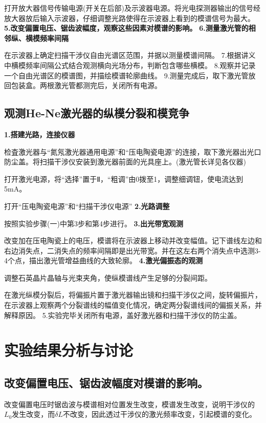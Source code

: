 \documentclass[UTF8]{ctexart}
\begin{document}
\begin{multicols}{2}
打开放大器信号传输电源(开关在后部)及示波器电源。将光电探测器输出的信号经放大器放后输入示波器，仔细调整光路使得在示波器上看到的模谱信号为最大。
\newline\textbf{5.改变偏置电压、锯齿波幅度，观察这些因素对模谱的影响。}
\newline\textbf{6.测量激光管的相邻纵、横模频率间隔}

在示波器上确定扫描干涉仪自由光谱区范围，并据以测量模谱间隔。
\newline7.根据讲义中横模频率间隔公式结合观测横向光场分布，判断包含哪些横模。
\newline8.观察并记录一个自由光谱区的模谱图，并描绘模谱轮廓曲线。
\newline9.测量完成后，取下激光管放回包装盒。两根激光管都测完后，关闭所有电源。

\subsection{观测He-Ne激光器的纵模分裂和模竞争}
\noindent\textbf{1.搭建光路，连接仪器}

检査激光器与“氮氖激光器通用电源”和“压电陶瓷电源”的连接，取下激光器出光口防尘盖。将扫描干涉仪安装到激光器前面的光具座上。(激光管长详见各仪器)

打开激光电源，将“选择”置于Ⅱ，“粗调”由0拨至1，调整细调钮，使电流达到5mA。

打开“压电陶瓷电源”和“扫描干涉仪电源”
\newline\textbf{2.光路调整}

按照实验步骤(一)中第3步和第4步进行。
\newline\textbf{3.出光带宽观测}

改变加在压电陶瓷上的电压，模谱将在示波器上移动并改变幅值。记下谱线左边和右边消失点，二消失点的频率间隔即是出光带宽。并在这左右两个消失点中选测3-4个点，描出激光管增益曲线的大致轮廓。
\newline\textbf{4.激光偏振态的观测}

调整石英晶片晶轴与光束夹角，使纵模谱线产生足够的分裂间距。

在激光纵模分裂后，将偏振片置于激光器输出镜和扫描干涉仪之间，旋转偏振片，在示波器上观察两个分裂谱线的幅值变化情况，确定两分裂谱线间的偏振关系，并解释原因。
\newline5.实验完毕关闭所有电源，盖好激光器和扫描干涉仪的防尘盖。


\section{实验结果分析与讨论}
\subsection{改变偏置电压、锯齿波幅度对模谱的影响。}
改变偏置电压时锯齿波与模谱相对位置发生改变，模谱发生改变，说明干涉仪的$L_0$发生改变，而$\delta L$不改变，因此透过干涉仪的激光频率改变，引起模谱的变化。

\end{multicols}
\end{document}
